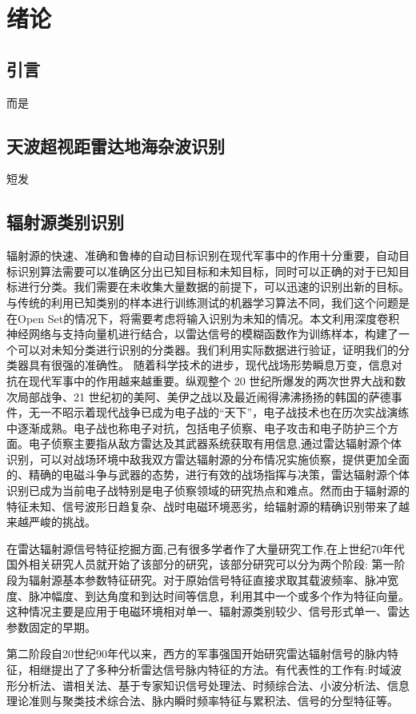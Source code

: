 \chapter{绪论}
\section{引言}
而是
\section{天波超视距雷达地海杂波识别}
短发
\section{辐射源类别识别}

辐射源的快速、准确和鲁棒的自动目标识别在现代军事中的作用十分重要，自动目标识别算法需要可以准确区分出已知目标和未知目标，同时可以正确的对于已知目标进行分类。我们需要在未收集大量数据的前提下，可以迅速的识别出新的目标。与传统的利用已知类别的样本进行训练测试的机器学习算法不同，我们这个问题是在Open Set的情况下，将需要考虑将输入识别为未知的情况。本文利用深度卷积神经网络与支持向量机进行结合，以雷达信号的模糊函数作为训练样本，构建了一个可以对未知分类进行识别的分类器。我们利用实际数据进行验证，证明我们的分类器具有很强的准确性。
随着科学技术的进步，现代战场形势瞬息万变，信息对抗在现代军事中的作用越来越重要。纵观整个 20 世纪所爆发的两次世界大战和数次局部战争、21 世纪初的美阿、美伊之战以及最近闹得沸沸扬扬的韩国的萨德事件，无一不昭示着现代战争已成为电子战的“天下”，电子战技术也在历次实战演练中逐渐成熟。电子战也称电子对抗，包括电子侦察、电子攻击和电子防护三个方面。电子侦察主要指从敌方雷达及其武器系统获取有用信息,通过雷达辐射源个体识别，可以对战场环境中敌我双方雷达辐射源的分布情况实施侦察，提供更加全面的、精确的电磁斗争与武器的态势，进行有效的战场指挥与决策，雷达辐射源个体识别已成为当前电子战特别是电子侦察领域的研究热点和难点。然而由于辐射源的特征未知、信号波形日趋复杂、战时电磁环境恶劣，给辐射源的精确识别带来了越来越严峻的挑战。

在雷达辐射源信号特征挖掘方面,己有很多学者作了大量研究工作,在上世纪70年代国外相关研究人员就开始了该部分的研究，该部分研究可以分为两个阶段:
第一阶段为辐射源基本参数特征研究。对于原始信号特征直接求取其载波频率、脉冲宽度、脉冲幅度、到达角度和到达时间等信息，利用其中一个或多个作为特征向量。这种情况主要是应用于电磁环境相对单一、辐射源类别较少、信号形式单一、雷达参数固定的早期。

第二阶段自20世纪90年代以来，西方的军事强国开始研究雷达辐射信号的脉内特征，相继提出了了多种分析雷达信号脉内特征的方法。有代表性的工作有:时域波形分析法、谱相关法、基于专家知识信号处理法、时频综合法、小波分析法、信息理论准则与聚类技术综合法、脉内瞬时频率特征与累积法、信号的分型特征等。

